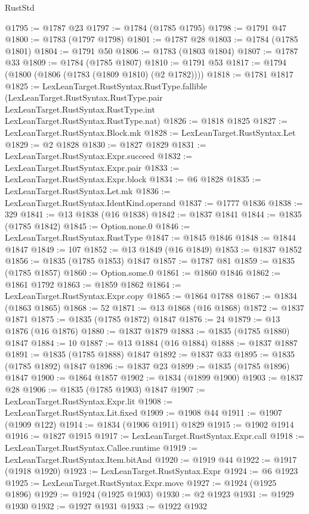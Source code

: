 \begin{lexlean}{RustStd}
\begin{coremodule}
@1795 := @1787 @23
@1797 := @1784 (@1785 @1795)
@1798 := @1791 @47
@1800 := @1783 (@1797 @1798)
@1801 := @1787 @28
@1803 := @1784 (@1785 @1801)
@1804 := @1791 @50
@1806 := @1783 (@1803 @1804)
@1807 := @1787 @33
@1809 := @1784 (@1785 @1807)
@1810 := @1791 @53
@1817 := @1794 (@1800 (@1806 (@1783 (@1809 @1810) (@2 @1782))))
@1818 := @1781 @1817
@1825 := LexLeanTarget.RustSyntax.RustType.fallible
    (LexLeanTarget.RustSyntax.RustType.pair
      LexLeanTarget.RustSyntax.RustType.int
      LexLeanTarget.RustSyntax.RustType.nat)
@1826 := @1818 @1825
@1827 := LexLeanTarget.RustSyntax.Block.mk
@1828 := LexLeanTarget.RustSyntax.Let
@1829 := @2 @1828
@1830 := @1827 @1829
@1831 := LexLeanTarget.RustSyntax.Expr.succeed
@1832 := LexLeanTarget.RustSyntax.Expr.pair
@1833 := LexLeanTarget.RustSyntax.Expr.block
@1834 := @6 @1828
@1835 := LexLeanTarget.RustSyntax.Let.mk
@1836 := LexLeanTarget.RustSyntax.IdentKind.operand
@1837 := @1777 @1836
@1838 := 329
@1841 := @13 @1838 (@16 @1838)
@1842 := @1837 @1841
@1844 := @1835 (@1785 @1842)
@1845 := Option.none.{0}
@1846 := LexLeanTarget.RustSyntax.RustType
@1847 := @1845 @1846
@1848 := @1844 @1847
@1849 := 107
@1852 := @13 @1849 (@16 @1849)
@1853 := @1837 @1852
@1856 := @1835 (@1785 @1853) @1847
@1857 := @1787 @81
@1859 := @1835 (@1785 @1857)
@1860 := Option.some.{0}
@1861 := @1860 @1846
@1862 := @1861 @1792
@1863 := @1859 @1862
@1864 := LexLeanTarget.RustSyntax.Expr.copy
@1865 := @1864 @1788
@1867 := @1834 (@1863 @1865)
@1868 := 52
@1871 := @13 @1868 (@16 @1868)
@1872 := @1837 @1871
@1875 := @1835 (@1785 @1872) @1847
@1876 := 24
@1879 := @13 @1876 (@16 @1876)
@1880 := @1837 @1879
@1883 := @1835 (@1785 @1880) @1847
@1884 := 10
@1887 := @13 @1884 (@16 @1884)
@1888 := @1837 @1887
@1891 := @1835 (@1785 @1888) @1847
@1892 := @1837 @33
@1895 := @1835 (@1785 @1892) @1847
@1896 := @1837 @23
@1899 := @1835 (@1785 @1896) @1847
@1900 := @1864 @1857
@1902 := @1834 (@1899 @1900)
@1903 := @1837 @28
@1906 := @1835 (@1785 @1903) @1847
@1907 := LexLeanTarget.RustSyntax.Expr.lit
@1908 := LexLeanTarget.RustSyntax.Lit.fixed
@1909 := @1908 @44
@1911 := @1907 (@1909 @122)
@1914 := @1834 (@1906 @1911) @1829
@1915 := @1902 @1914
@1916 := @1827 @1915
@1917 := LexLeanTarget.RustSyntax.Expr.call
@1918 := LexLeanTarget.RustSyntax.Callee.runtime
@1919 := LexLeanTarget.RustSyntax.Item.bitAnd
@1920 := @1919 @44
@1922 := @1917 (@1918 @1920)
@1923 := LexLeanTarget.RustSyntax.Expr
@1924 := @6 @1923
@1925 := LexLeanTarget.RustSyntax.Expr.move
@1927 := @1924 (@1925 @1896)
@1929 := @1924 (@1925 @1903)
@1930 := @2 @1923
@1931 := @1929 @1930
@1932 := @1927 @1931
@1933 := @1922 @1932

\end{coremodule}
\end{lexlean}
